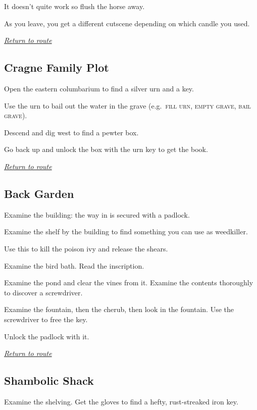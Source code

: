 \documentclass[a5paper]{extarticle}
\begin{document}
It doesn't quite work so flush the horse away.

As you leave, you get a different cutscene depending on which candle you used.

\hyperref[sec:route-3]{\emph{Return to route}}

\newpage
\subsection{Cragne Family Plot}\label{sec:sol-Cragne-Family-Plot}

Open the eastern columbarium to find a silver urn and a key.

Use the urn to bail out the water in the grave (e.g.~\textsc{fill urn},
\textsc{empty grave}, \textsc{bail grave}).

Descend and dig west to find a pewter box.

Go back up and unlock the box with the urn key to get the book.

\hyperref[sec:route-3]{\emph{Return to route}}

\newpage
\subsection{Back Garden}\label{sec:sol-Back-Garden}

Examine the building: the way in is secured with a padlock.

Examine the shelf by the building to find something you can use as weedkiller.

Use this to kill the poison ivy and release the shears.

Examine the bird bath. Read the inscription.

Examine the pond and clear the vines from it.
Examine the contents thoroughly to discover a screwdriver.

Examine the fountain, then the cherub, then look in the fountain.
Use the screwdriver to free the key.

Unlock the padlock with it.

\hyperref[sec:route-3]{\emph{Return to route}}

\newpage
\subsection{Shambolic Shack}\label{sec:sol-Shambolic-Shack-0}

Examine the shelving. Get the gloves to find a hefty, rust-streaked iron key.
\end{document}
